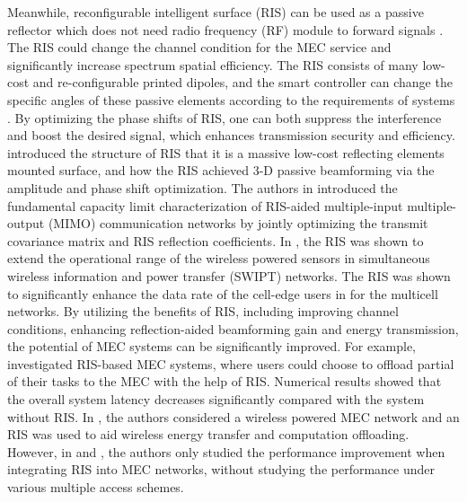 \documentclass[journal]{IEEEtran}
\begin{document}
Meanwhile, reconfigurable intelligent surface (RIS) can be used as a passive reflector which does not need radio frequency (RF) module to forward signals \cite{CHuang1,yang2020energyefficient,yang2021federated}. The RIS could change the channel condition for the MEC service and significantly increase spectrum spatial efficiency.
The RIS consists of many low-cost and re-configurable printed dipoles, and the smart controller can change the specific angles of these passive elements according to the requirements of systems \cite{CHuang2,wuIRS}. By optimizing the phase shifts of RIS, one can both suppress the interference and boost the desired signal, which enhances transmission security and efficiency\cite{hongartificial, LPan,yang2020RIS}.
\cite{qqq} introduced the structure of RIS that it is a massive low-cost reflecting elements mounted surface, and how the RIS achieved 3-D passive beamforming via the amplitude and phase shift optimization.	
The authors in \cite{SZhangCapacity} introduced the fundamental capacity limit characterization of RIS-aided multiple-input multiple-output (MIMO) communication networks by jointly optimizing the transmit covariance matrix and RIS reflection coefficients.
In \cite{JSCPan}, the RIS was shown to extend the operational range of the wireless powered sensors in simultaneous wireless information and power transfer (SWIPT) networks.
The RIS was shown to significantly enhance the data rate of the cell-edge users in \cite{TCOMpan} for the multicell networks.
By utilizing the benefits of RIS, including improving channel conditions, enhancing reflection-aided beamforming gain and energy transmission, the potential of MEC systems can be significantly improved.
For example, \cite{Latencybai} investigated RIS-based MEC systems, where users could choose to offload partial of their tasks to the MEC with the help of RIS. Numerical results showed that the overall system latency decreases significantly compared with the system without RIS. In \cite{bai2020resource}, the authors considered a wireless powered MEC network and an RIS was used to aid wireless energy transfer and computation offloading. {However, in \cite{Latencybai} and \cite{bai2020resource}, the authors only studied the performance improvement when integrating RIS into MEC networks, without studying the performance under various multiple access schemes.}
\end{document}
